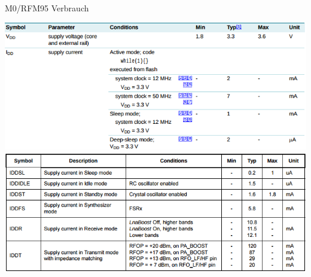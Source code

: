 \documentclass[18pt]{beamer}
\begin{document}
\begin{frame}{M0/RFM95 Verbrauch}%
	\begin{minipage}[t][\textheight][t]{\textwidth}
		\centering
		\includegraphics[height=0.4\textheight]{images/m0power.png}\\
		\includegraphics[height=0.4\textheight]{images/lorapower.png}
	\end{minipage}
\end{frame}

\backupend
\end{document}
